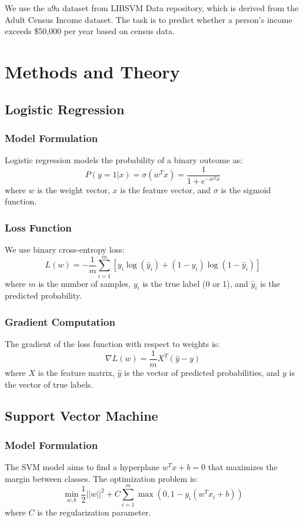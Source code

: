 \documentclass[journal, a4paper]{IEEEtran}
\begin{document}
We use the a9a dataset from LIBSVM Data repository, which is derived from the Adult Census Income dataset. The task is to predict whether a person's income exceeds \$50,000 per year based on census data.

\section{Methods and Theory}
\subsection{Logistic Regression}
\subsubsection{Model Formulation}
Logistic regression models the probability of a binary outcome as:
\begin{equation}
P(y=1|x) = \sigma(w^T x) = \frac{1}{1 + e^{-w^T x}}
\end{equation}
where $w$ is the weight vector, $x$ is the feature vector, and $\sigma$ is the sigmoid function.

\subsubsection{Loss Function}
We use binary cross-entropy loss:
\begin{equation}
L(w) = -\frac{1}{m}\sum_{i=1}^{m}[y_i\log(\hat{y}_i) + (1-y_i)\log(1-\hat{y}_i)]
\end{equation}
where $m$ is the number of samples, $y_i$ is the true label (0 or 1), and $\hat{y}_i$ is the predicted probability.

\subsubsection{Gradient Computation}
The gradient of the loss function with respect to weights is:
\begin{equation}
\nabla L(w) = \frac{1}{m} X^T (\hat{y} - y)
\end{equation}
where $X$ is the feature matrix, $\hat{y}$ is the vector of predicted probabilities, and $y$ is the vector of true labels.

\subsection{Support Vector Machine}
\subsubsection{Model Formulation}
The SVM model aims to find a hyperplane $w^T x + b = 0$ that maximizes the margin between classes. The optimization problem is:
\begin{equation}
\min_{w,b} \frac{1}{2} ||w||^2 + C\sum_{i=1}^{m} \max(0, 1 - y_i(w^T x_i + b))
\end{equation}
where $C$ is the regularization parameter.
\end{document}
